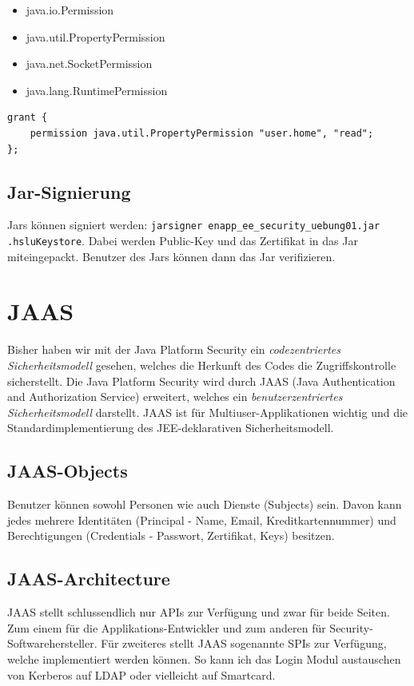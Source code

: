 \begin{multicols}{2}
\begin{itemize}
	\item java.io.Permission
	\item java.util.PropertyPermission
	\item java.net.SocketPermission
	\item java.lang.RuntimePermission
\end{itemize}
\end{multicols}

\begin{lstlisting}
grant {
	permission java.util.PropertyPermission "user.home", "read";
};
\end{lstlisting}

\subsection{Jar-Signierung}
Jars können signiert werden: \verb|jarsigner enapp_ee_security_uebung01.jar .hsluKeystore|. Dabei werden Public-Key und das Zertifikat in das Jar miteingepackt. Benutzer des Jars können dann das Jar verifizieren.


\section{JAAS}
Bisher haben wir mit der Java Platform Security ein \emph{codezentriertes Sicherheitsmodell} gesehen, welches die Herkunft des Codes die Zugriffskontrolle sicherstellt. Die Java Platform Security wird durch JAAS (Java Authentication and Authorization Service) erweitert, welches ein \emph{benutzerzentriertes Sicherheitsmodell} darstellt. JAAS ist für Multiuser-Applikationen wichtig und die Standardimplementierung des JEE-deklarativen Sicherheitsmodell.

\subsection{JAAS-Objects}
Benutzer können sowohl Personen wie auch Dienste (Subjects) sein. Davon kann jedes mehrere Identitäten (Principal - Name, Email, Kreditkartennummer) und Berechtigungen (Credentials - Passwort, Zertifikat, Keys) besitzen. 

\subsection{JAAS-Architecture}
JAAS stellt schlussendlich nur APIs zur Verfügung und zwar für beide Seiten. Zum einem für die Applikations-Entwickler und zum anderen für Security-Softwarehersteller. Für zweiteres stellt JAAS sogenannte SPIs zur Verfügung, welche implementiert werden können. So kann ich das Login Modul austauschen von Kerberos auf LDAP oder vielleicht auf Smartcard.





